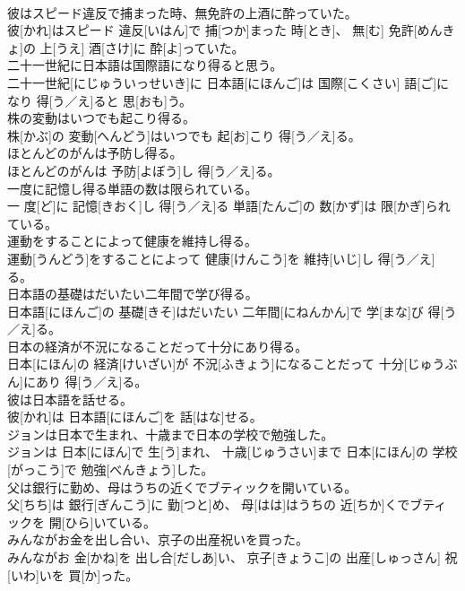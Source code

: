 \documentclass[8pt]{extreport}
\begin{document}
\begin{CJK}{UTF8}{min}
\\	彼はスピード違反で捕まった時、無免許の上酒に酔っていた。	
\\	彼[かれ]はスピード 違反[いはん]で 捕[つか]まった 時[とき]、 無[む] 免許[めんきょ]の 上[うえ] 酒[さけ]に 酔[よ]っていた。
\\	二十一世紀に日本語は国際語になり得ると思う。	
\\	二十一世紀[にじゅういっせいき]に 日本語[にほんご]は 国際[こくさい] 語[ご]になり 得[う／え]ると 思[おも]う。
\\	株の変動はいつでも起こり得る。	
\\	株[かぶ]の 変動[へんどう]はいつでも 起[お]こり 得[う／え]る。
\\	ほとんどのがんは予防し得る。	
\\	ほとんどのがんは 予防[よぼう]し 得[う／え]る。
\\	一度に記憶し得る単語の数は限られている。	
\\	一 度[ど]に 記憶[きおく]し 得[う／え]る 単語[たんご]の 数[かず]は 限[かぎ]られている。
\\	運動をすることによって健康を維持し得る。	
\\	運動[うんどう]をすることによって 健康[けんこう]を 維持[いじ]し 得[う／え]る。
\\	日本語の基礎はだいたい二年間で学び得る。	
\\	日本語[にほんご]の 基礎[きそ]はだいたい 二年間[にねんかん]で 学[まな]び 得[う／え]る。
\\	日本の経済が不況になることだって十分にあり得る。	
\\	日本[にほん]の 経済[けいざい]が 不況[ふきょう]になることだって 十分[じゅうぶん]にあり 得[う／え]る。
\\	彼は日本語を話せる。	
\\	彼[かれ]は 日本語[にほんご]を 話[はな]せる。
\\	ジョンは日本で生まれ、十歳まで日本の学校で勉強した。	
\\	ジョンは 日本[にほん]で 生[う]まれ、 十歳[じゅうさい]まで 日本[にほん]の 学校[がっこう]で 勉強[べんきょう]した。
\\	父は銀行に勤め、母はうちの近くでブティックを開いている。	
\\	父[ちち]は 銀行[ぎんこう]に 勤[つと]め、 母[はは]はうちの 近[ちか]くでブティックを 開[ひら]いている。
\\	みんながお金を出し合い、京子の出産祝いを買った。	
\\	みんながお 金[かね]を 出し合[だしあ]い、 京子[きょうこ]の 出産[しゅっさん] 祝[いわ]いを 買[か]った。

\end{CJK}
\end{document}
